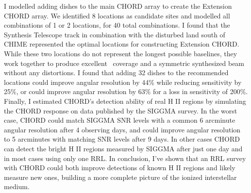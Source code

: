 I modelled adding dishes to the main CHORD array to create the Extension CHORD array. We identified 8 locations as candidate sites and modelled all combinations of 1 or 2 locations, for 40 total combinations. I found that the Synthesis Telescope track in combination with the disturbed land south of CHIME represented the optimal locations for constructing Extension CHORD. While these two locations do not represent the longest possible baselines, they work together to produce excellent \UV\ coverage and a symmetric synthesized beam without any distortions. I found that adding 32 dishes to the recommended locations could improve angular resolution by 44\% while reducing sensitivity by 25\%, or could improve angular resolution by 63\% for a loss in sensitivity of 200\%.\\

Finally, I estimated CHORD's detection ability of real H II regions by simulating the CHORD response on data published by the SIGGMA survey. In the worst case, CHORD could match SIGGMA SNR levels with a common 6 arcminute angular resolution after 4 observing days, and could improve angular resolution to 5 arcminutes with matching SNR levels after 9 days. In other cases CHORD can detect the bright H II regions measured by SIGGMA after just one day and in most cases using only one RRL. In conclusion, I've shown that an RRL survey with CHORD could both improve detections of known H II regions and likely measure new ones, building a more complete picture of the ionized interstellar medium.\\

